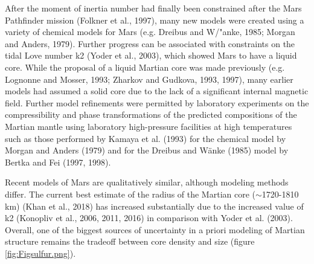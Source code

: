 After the moment of inertia number had finally been constrained after the Mars Pathfinder mission (Folkner et al., 1997), many new models were created using a variety of chemical models for Mars (e.g. Dreibus and W/"{a}nke, 1985; Morgan and Anders, 1979). Further progress can be associated with constraints on the tidal Love number k2 (Yoder et al., 2003), which showed Mars to have a liquid core. While the proposal of a liquid Martian core was made previously (e.g. Lognonne and Mosser, 1993; Zharkov and Gudkova, 1993, 1997), many earlier models had assumed a solid core due to the lack of a significant internal magnetic field.  Further model refinements were permitted by laboratory experiments on the compressibility and phase transformations of the predicted compositions of the Martian mantle using laboratory high-pressure facilities at high temperatures such as those performed by Kamaya et al. (1993) for the chemical model by Morgan and Anders (1979) and for the Dreibus and W\"{a}nke (1985) model by Bertka and Fei (1997, 1998).

Recent models of Mars are qualitatively similar, although modeling methods differ. The current best estimate of the radius of the Martian core ($\sim$1720-1810 km) (Khan et al., 2018) has increased substantially due to the increased value of k2 (Konopliv et al., 2006, 2011, 2016) in comparison with Yoder et al. (2003).  Overall, one of the biggest sources of uncertainty in a priori modeling of Martian structure remains the tradeoff between core density and size (figure \ref{fig:Figsulfur.png}).

